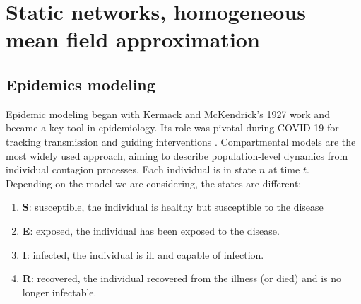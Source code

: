 \chapter{Static networks, homogeneous mean field approximation}


\section{Epidemics modeling}
Epidemic modeling began with Kermack and McKendrick’s 1927 work \cite{kermack1927contribution} and became a key tool in epidemiology. Its role was pivotal during COVID-19 for tracking transmission and guiding interventions \cite{ferguson2020impact, flaxman2020estimating, giordano2020modelling}. Compartmental models are the most widely used approach, aiming to describe population-level dynamics from individual contagion processes. Each individual is in state $n$ at time $t$. \\
Depending on the model we are considering, the states are different:
\begin{enumerate}
    \item \textbf{S}: susceptible, the individual is healthy but susceptible to the disease
    \item \textbf{E}: exposed, the individual has been exposed to the disease.
    \item \textbf{I}: infected, the individual is ill and capable of infection. 
    \item \textbf{R}: recovered, the individual recovered from the illness (or died) and is no longer infectable. 
\end{enumerate}
 
